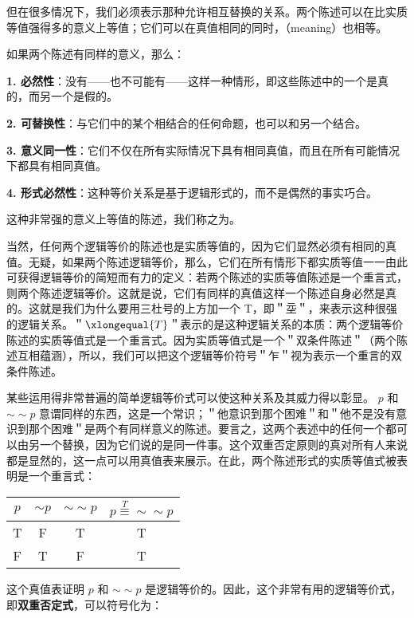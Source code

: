 但在很多情况下，我们必须表示那种允许相互替换的关系。两个陈述可以在比实质等值强得多的意义上等值；它们可以在真值相同的同时，（meaning）也相等。

\begin{theorembox}[title=逻辑等价的本质特征]
如果两个陈述有同样的意义，那么：

\textbf{1. 必然性}：没有——也不可能有——这样一种情形，即这些陈述中的一个是真的，而另一个是假的。

\textbf{2. 可替换性}：与它们中的某个相结合的任何命题，也可以和另一个结合。

\textbf{3. 意义同一性}：它们不仅在所有实际情况下具有相同真值，而且在所有可能情况下都具有相同真值。

\textbf{4. 形式必然性}：这种等价关系是基于逻辑形式的，而不是偶然的事实巧合。
\end{theorembox}

这种非常强的意义上等值的陈述，我们称之为。

当然，任何两个逻辑等价的陈述也是实质等值的，因为它们显然必须有相同的真值。无疑，如果两个陈述逻辑等价，那么，它们在所有情形下都实质等值一一由此可获得逻辑等价的简短而有力的定义：若两个陈述的实质等值陈述是一个重言式，则两个陈述逻辑等价。这就是说，它们有同样的真值这样一个陈述自身必然是真的。这就是我们为什么要用三杜号的上方加一个 T，即＂坖＂，来表示这种很强的逻辑关系。＂$\xlongequal{T}$＂表示的是这种逻辑关系的本质：两个逻辑等价陈述的实质等值式是一个重言式。因为实质等值式是一个＂双条件陈述＂（两个陈述互相蕴涵），所以，我们可以把这个逻辑等价符号＂乍＂视为表示一个重言的双条件陈述。

某些运用得非常普遍的简单逻辑等价式可以使这种关系及其威力得以彰显。 $p$ 和 $\sim \sim p$ 意谓同样的东西，这是一个常识；＂他意识到那个困难＂和＂他不是没有意识到那个困难＂是两个有同样意义的陈述。要言之，这两个表述中的任何一个都可以由另一个替换，因为它们说的是同一件事。这个双重否定原则的真对所有人来说都是显然的，这一点可以用真值表来展示。在此，两个陈述形式的实质等值式被表明是一个重言式：

\begin{center}
\begin{tabular}{|cccc|}
\hline
$p$ & $\sim p$ & $\sim \sim p$ & $p \stackrel{T}{\equiv} \sim \sim p$ \\
\hline
T & F & T & T \\
F & T & F & T \\
\hline
\end{tabular}
\end{center}

这个真值表证明 $p$ 和 $\sim \sim p$ 是逻辑等价的。因此，这个非常有用的逻辑等价式，即\textbf{双重否定式}，可以符号化为：

